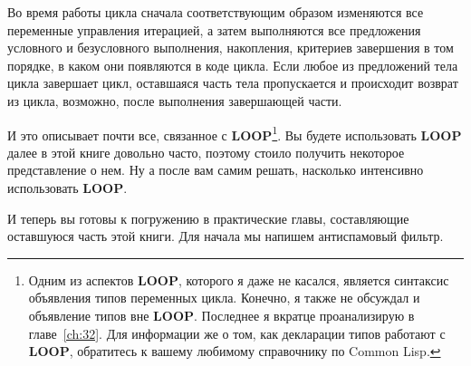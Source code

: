 Во время работы цикла сначала соответствующим образом изменяются все переменные управления
итерацией, а затем выполняются все предложения условного и безус\-лов\-но\-го выполнения,
накопления, критериев завершения в том порядке, в каком они появляются в коде цикла. Если
любое из предложений тела цикла завершает цикл, оставшаяся часть тела пропускается и
происходит возврат из цикла, возможно, после выполнения завершающей части.

И это описывает почти все, связанное с \textbf{LOOP}\footnote{Одним из аспектов
  \textbf{LOOP}, которого я даже не касался, является синтаксис объявления типов
  переменных цикла. Конечно, я также не обсуждал и объявление типов вне
  \textbf{LOOP}. Последнее я вкратце проанализирую в главе~\ref{ch:32}. Для информации же о том,
  как декларации типов работают с \textbf{LOOP}, обратитесь к вашему любимому справочнику
  по Common Lisp.}. Вы будете использовать \textbf{LOOP} далее в этой книге довольно
часто, поэтому стоило получить некоторое представление о нем. Ну а после вам самим решать,
насколько интенсивно использовать \textbf{LOOP}.

И теперь вы готовы к погружению в практические главы, составляющие оставшуюся часть этой
книги. Для начала мы напишем антиспамовый фильтр.


